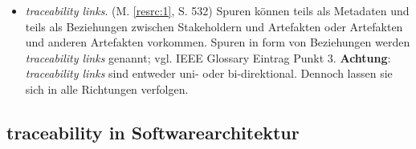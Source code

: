 \begin{itemize}
\item
\textit{traceability links}. (M. \ref{resrc:1}, S. 532)
\newline
Spuren können teils als Metadaten und teils als Beziehungen zwischen Stakeholdern und Artefakten oder Artefakten und anderen Artefakten vorkommen. Spuren in form von Beziehungen werden \textit{traceability links} genannt; vgl. IEEE Glossary Eintrag Punkt 3. 
\newline
\textbf{Achtung}: \textit{traceability links} sind entweder uni- oder bi-direktional. Dennoch lassen sie sich in alle Richtungen verfolgen.

\end{itemize}


\subsection{traceability in Softwarearchitektur}
